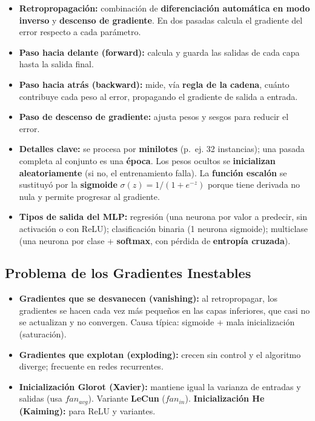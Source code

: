 \documentclass[12pt]{book} %
\providecommand{\tightlist}{%
  \setlength{\itemsep}{0pt}\setlength{\parskip}{0pt}}
\begin{document}
\begin{itemize}
\tightlist
\item
  \textbf{Retropropagación:} combinación de \textbf{diferenciación
  automática en modo inverso} y \textbf{descenso de gradiente}. En dos
  pasadas calcula el gradiente del error respecto a cada parámetro.
\item
  \textbf{Paso hacia delante (forward):} calcula y guarda las salidas de
  cada capa hasta la salida final.
\item
  \textbf{Paso hacia atrás (backward):} mide, vía \textbf{regla de la
  cadena}, cuánto contribuye cada peso al error, propagando el gradiente
  de salida a entrada.
\item
  \textbf{Paso de descenso de gradiente:} ajusta pesos y sesgos para
  reducir el error.
\item
  \textbf{Detalles clave:} se procesa por \textbf{minilotes} (p.~ej. 32
  instancias); una pasada completa al conjunto es una \textbf{época}.
  Los pesos ocultos se \textbf{inicializan aleatoriamente} (si no, el
  entrenamiento falla). La \textbf{función escalón} se sustituyó por la
  \textbf{sigmoide} \(\sigma(z)=1/(1+e^{-z})\) porque tiene derivada no
  nula y permite progresar al gradiente.
\item
  \textbf{Tipos de salida del MLP:} regresión (una neurona por valor a
  predecir, sin activación o con ReLU); clasificación binaria (1 neurona
  sigmoide); multiclase (una neurona por clase + \textbf{softmax}, con
  pérdida de \textbf{entropía cruzada}).
\end{itemize}

\hypertarget{problema-de-los-gradientes-inestables}{%
\subsection{Problema de los Gradientes
Inestables}\label{problema-de-los-gradientes-inestables}}

\begin{itemize}
\tightlist
\item
  \textbf{Gradientes que se desvanecen (vanishing):} al retropropagar,
  los gradientes se hacen cada vez más pequeños en las capas inferiores,
  que casi no se actualizan y no convergen. Causa típica: sigmoide +
  mala inicialización (saturación).
\item
  \textbf{Gradientes que explotan (exploding):} crecen sin control y el
  algoritmo diverge; frecuente en redes recurrentes.
\item
  \textbf{Inicialización Glorot (Xavier):} mantiene igual la varianza de
  entradas y salidas (usa \(fan_{avg}\)). Variante \textbf{LeCun}
  (\(fan_{in}\)). \textbf{Inicialización He (Kaiming):} para ReLU y
  variantes.
\end{itemize}
\end{document}

